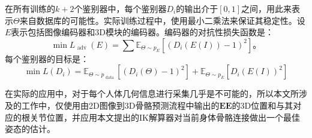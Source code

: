 \begin{itemize}
在所有训练的$k+2$个鉴别器中，每个鉴别器$D_i$的输出介于$[0,1]$之间，用此来表示$\Theta$来自数据库的可能性。实际训练过程中，使用最小二乘法来保证其稳定性。设$E$表示包括图像编码器和3D模块的编码器。编码器的对抗性损失函数是：\begin{equation}
\min L_{\text { adv }}(E)=\sum \mathbb{E}_{\Theta \sim p_{E}}\left[\left(D_{i}(E(I))-1\right)^{2}\right]。
\end{equation}
每个鉴别器的目标是：\begin{equation}
\min L\left(D_{i}\right)=\mathbb{E}_{\Theta \sim p_{\text { data }}}\left[\left(D_{i}(\Theta)-1\right)^{2}\right]+\mathbb{E}_{\Theta \sim p_{E}}\left[D_{i}(E(I))^{2}\right]
\end{equation}
\end{itemize}


在实际的应用中，对于每个人体几何信息进行采集几乎是不可能的，所以本文所涉及的工作中，仅使用由2D图像到3D骨骼预测流程中输出的$\mathbf{EE}$的3D位置和与其对应的根关节位置，并应用本文提出的IK解算器对当前身体骨骼连接做出一个最佳姿态的估计。
